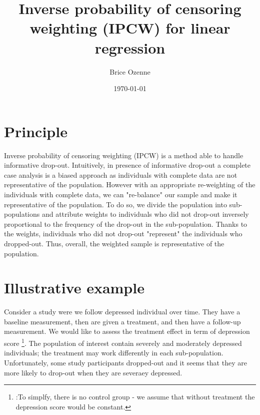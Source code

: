\documentclass[12pt]{article}
\author{Brice Ozenne}
\date{\today}
\title{Inverse probability of censoring weighting (IPCW) for linear regression}
\begin{document}
\maketitle

\section{Principle}
\label{sec:org6b5d322}

Inverse probability of censoring weighting (IPCW) is a method able to
handle informative drop-out. Intuitively, in presence of informative
drop-out a complete case analysis is a biased approach as individuals
with complete data are not representative of the population. However
with an appropriate re-weighting of the individuals with complete
data, we can "re-balance" our sample and make it representative of the
population. To do so, we divide the population into sub-populations
and attribute weights to individuals who did not drop-out inversely
proportional to the frequency of the drop-out in the
sub-population. Thanks to the weights, individuals who did not
drop-out "represent" the individuals who dropped-out. Thus, overall,
the weighted sample is representative of the population.



\section{Illustrative example}
\label{sec:org88ba9e6}

Consider a study were we follow depressed individual over time. They
have a baseline measurement, then are given a treatment, and then have
a follow-up measurement. We would like to assess the treatment effect
in term of depression score \footnote{:To simplfy, there is no control
group - we assume that without treatment the depression score would be
constant.}. The population of interest contain severely and moderately
depressed individuals; the treatment may work differently in each
sub-population. Unfortunately, some study participants dropped-out and
it seems that they are more likely to drop-out when they are severaey
depressed.

\clearpage
\end{document}
